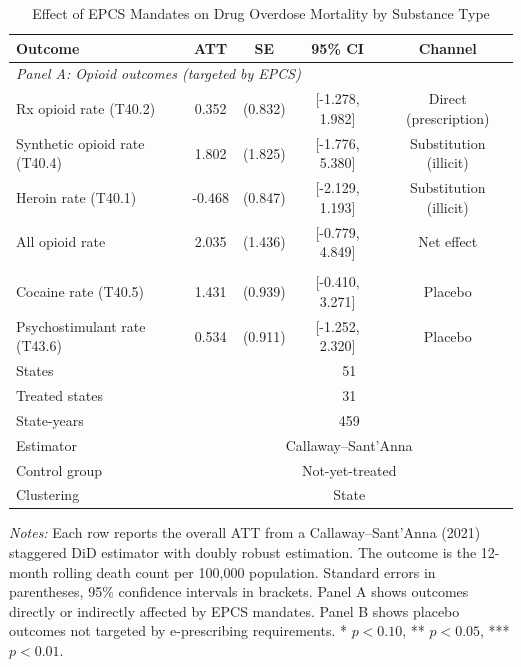 \begin{table}[H]
\centering
\caption{Effect of EPCS Mandates on Drug Overdose Mortality by Substance Type}
\label{tab:main}
\begin{threeparttable}
\begin{tabular}{lcccc}
\toprule
Outcome & ATT & SE & 95\% CI & Channel \\
\midrule
\multicolumn{5}{l}{\textit{Panel A: Opioid outcomes (targeted by EPCS)}} \\
Rx opioid rate (T40.2) & 0.352 & (0.832) & [-1.278, 1.982] & Direct (prescription) \\
Synthetic opioid rate (T40.4) & 1.802 & (1.825) & [-1.776, 5.380] & Substitution (illicit) \\
Heroin rate (T40.1) & -0.468 & (0.847) & [-2.129, 1.193] & Substitution (illicit) \\
All opioid rate & 2.035 & (1.436) & [-0.779, 4.849] & Net effect \\
\addlinespace
\multicolumn{5}{l}{\textit{Panel B: Placebo outcomes (not targeted by EPCS)}} \\
Cocaine rate (T40.5) & 1.431 & (0.939) & [-0.410, 3.271] & Placebo \\
Psychostimulant rate (T43.6) & 0.534 & (0.911) & [-1.252, 2.320] & Placebo \\
\midrule
States & \multicolumn{4}{c}{51} \\
Treated states & \multicolumn{4}{c}{31} \\
State-years & \multicolumn{4}{c}{459} \\
Estimator & \multicolumn{4}{c}{Callaway--Sant'Anna} \\
Control group & \multicolumn{4}{c}{Not-yet-treated} \\
Clustering & \multicolumn{4}{c}{State} \\
\bottomrule
\end{tabular}
\begin{tablenotes}[flushleft]
\small
\item \textit{Notes:} Each row reports the overall ATT from a Callaway--Sant'Anna (2021) staggered DiD estimator with doubly robust estimation. The outcome is the 12-month rolling death count per 100,000 population. Standard errors in parentheses, 95\% confidence intervals in brackets. Panel A shows outcomes directly or indirectly affected by EPCS mandates. Panel B shows placebo outcomes not targeted by e-prescribing requirements. * $p<0.10$, ** $p<0.05$, *** $p<0.01$.
\end{tablenotes}
\end{threeparttable}
\end{table}

